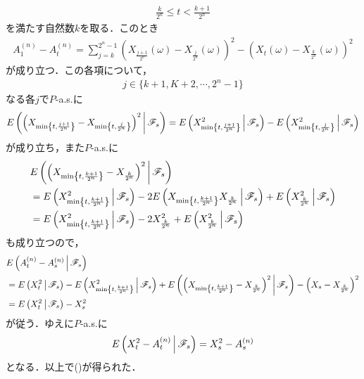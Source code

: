 \begin{sketch}
\begin{description}
				\begin{align}
					\frac{k}{2^{n}} \leq t < \frac{k+1}{2^{n}}
				\end{align}
				を満たす自然数$k$を取る．このとき
				\begin{align}
					A^{(n)}_{1} - A^{(n)}_{t}
					= \sum_{j=k}^{2^{n}-1} \left( X_{\frac{j+1}{2^{n}}}(\omega) - X_{\frac{j}{2^{n}}}(\omega) \right)^{2}
					- \left( X_{t}(\omega) - X_{\frac{k}{2^{n}}}(\omega) \right)^{2}
				\end{align}
				が成り立つ．この各項について，
				\begin{align}
					j \in \{k+1,K+2,\cdots,2^n-1\}
				\end{align}
				なる各$j$で$P$-a.s.に
				\begin{align}
					E\left(  \left(X_{\min\left\{t,\frac{j+1}{2^n}\right\}} - X_{\min\left\{t,\frac{j}{2^n}\right\}}\right)^2 \, \middle|\, \mathscr{F}_s \right)
					= E\left( X^2_{\min\left\{t,\frac{j+1}{2^n}\right\}} \, \middle|\, \mathscr{F}_s \right)
					 - E\left( X^2_{\min\left\{t,\frac{j}{2^n}\right\}} \, \middle|\, \mathscr{F}_s \right)
				\end{align}
				が成り立ち，また$P$-a.s.に
				\begin{align}
					&E\left( \left(X_{\min\left\{t,\frac{k+1}{2^n}\right\}} - X_{\frac{k}{2^n}}\right)^2 \, \middle|\, \mathscr{F}_s \right) \\
					&= E\left( X_{\min\left\{t,\frac{k+1}{2^n}\right\}}^2 \, \middle|\, \mathscr{F}_s \right)
					- 2 E\left( X_{\min\left\{t,\frac{k+1}{2^n}\right\}}X_{\frac{k}{2^n}} \, \middle|\, \mathscr{F}_s \right)
					+ E\left( X_{\frac{k}{2^n}}^2 \, \middle|\, \mathscr{F}_s \right) \\
					&= E\left( X_{\min\left\{t,\frac{k+1}{2^n}\right\}}^2 \, \middle|\, \mathscr{F}_s \right)
					- 2 X_{\frac{k}{2^n}}^2
					+ E\left( X_{\frac{k}{2^n}}^2 \, \middle|\, \mathscr{F}_s \right) \\
				\end{align}
				も成り立つので，
				\begin{align}
					&E\left( A^{(n)}_t - A^{(n)}_s \, \middle|\, \mathscr{F}_s \right) \\
					&= E\left( X^2_t \, \middle|\, \mathscr{F}_s \right)
					- E\left( X^2_{\min\left\{t,\frac{k+1}{2^n}\right\}} \, \middle|\, \mathscr{F}_s \right)
					+ E\left( \left(X_{\min\left\{t,\frac{k+1}{2^n}\right\}} - X_{\frac{k}{2^n}}\right)^2 \, \middle|\, \mathscr{F}_s \right)
					- \left(X_s - X_{\frac{k}{2^n}}\right)^2 \\
					&= E\left( X^2_t \, \middle|\, \mathscr{F}_s \right) - X_s^2
				\end{align}
				が従う．ゆえに$P$-a.s.に
				\begin{align}
					E\left( X^2_t - A^{(n)}_t \, \middle|\, \mathscr{F}_s \right) = X^2_s - A^{(n)}_s
				\end{align}
				となる．以上で()が得られた．
				

\end{description}
\end{sketch}
